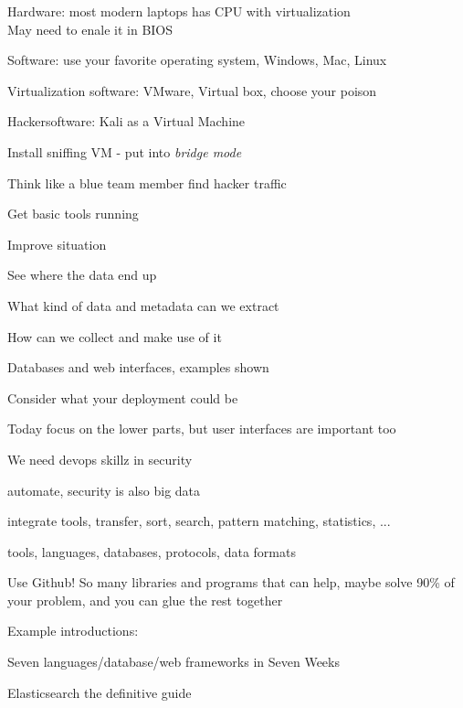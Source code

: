 \documentclass[20pt,landscape,a4paper,footrule]{foils}
\begin{document}


\begin{list2}
\item Hardware: most modern laptops has CPU with virtualization \\
May need to enale it in BIOS
\item Software: use your favorite operating system, Windows, Mac, Linux
\item Virtualization software: VMware, Virtual box, choose your poison
\item Hackersoftware: Kali as a Virtual Machine 
\item Install sniffing VM - put into \emph{bridge mode}
\end{list2}



\begin{list1}
\item Think like a blue team member find hacker traffic
\item Get basic tools running
\item Improve situation
\begin{list2}
\item See where the data end up
\item What kind of data and metadata can we extract
\item How can we collect and make use of it
\item Databases and web interfaces, examples shown
\item Consider what your deployment could be
\end{list2}
\end{list1}

\centerline{Today focus on the lower parts, but user interfaces are important too}


\begin{list1}
\item We need devops skillz in security
\item automate, security is also big data
\item integrate tools, transfer, sort, search, pattern matching, statistics, ...
\item tools, languages, databases, protocols, data formats
\item Use Github! So many libraries and programs that can help, maybe solve  90\% of your problem, and you can glue the rest together
\item Example introductions:
\begin{list2}
\item Seven languages/database/web frameworks in Seven Weeks
\item Elasticsearch the definitive guide
\end{list2}
\end{list1}
\end{document}
